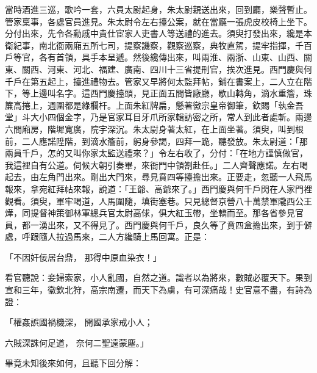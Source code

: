 \begin{showcontents}{}
當時酒進三巡，歌吟一套，六員太尉起身，朱太尉親送出來，回到廳，樂聲暫止。管家稟事，各處官員進見。朱太尉令左右擡公案，就在當廳一張虎皮校椅上坐下。分付出來，先令各勳戚中貴仕宦家人吏書人等送禮的進去。須臾打發出來，纔是本衛紀事，南北衙兩廂五所七司，提察譏察，觀察巡察，典牧直駕，提牢指揮，千百戶等官，各有首領，具手本呈遞。然後纔傳出來，叫兩淮、兩浙、山東、山西、關東、關西、河東、河北、福建、廣南、四川十三省提刑官，挨次進見。西門慶與何千戶在第五起上，擡進禮物去。管家又早將何太監拜帖，鋪在書案上，二人立在階下，等上邊叫名字。這西門慶擡頭，見正面五間皆廠廳，歇山轉角，滴水重簷，珠簾高捲上，週圍都是綠欄杆。上面朱紅牌扁，懸著黴宗皇帝御筆，欽賜「執金吾堂」斗大小四個金字，乃是官家耳目牙爪所家輯訪密之所，常人到此者處斬。兩邊六間廂房，階墀寬廣，院宇深沉。朱太尉身著太紅，在上面坐著。須臾，叫到根前，二人應諾陞階，到滴水簷前，躬身參謁，四拜一跪，聽發放。朱太尉道：「那兩員千戶，怎的又叫你家太監送禮來？」令左右收了，分付：「在地方謹慎做官，我這裡自有公道。伺候大朝引奏畢，來衙門中領劄赴任。」二人齊聲應諾。左右喝起去，由左角門出來。剛出大門來，尋見賁四等擡擔出來。正要走，忽聽一人飛馬報來，拿宛紅拜帖來報，說道：「王爺、高爺來了。」西門慶與何千戶閃在人家門裡觀看。須臾，軍牢喝道，人馬圍隨，填街塞巷。只見總督京營八十萬禁軍隴西公王燁，同提督神策御林軍總兵官太尉高俅，俱大紅玉帶，坐轎而至。那各省參見官員，都一湧出來，又不得見了。西門慶與何千戶，良久等了賁四盒擔出來，到于僻處，呼跟隨人拉過馬來，二人方纔騎上馬回寓。正是：

「不因奸佞居台鼎，  那得中原血染衣！」

看官聽說：妾婦索家，小人亂國，自然之道。識者以為將來，數賊必覆天下。果到宣和三年，徽欽北狩，高宗南遷，而天下為虜，有可深痛哉！史官意不盡，有詩為證：

「權姦誤國禍機深，  開國承家戒小人；

六賊深誅何足道，  奈何二聖遠蒙塵。」

畢竟未知後來如何，且聽下回分解：





\end{showcontents}


